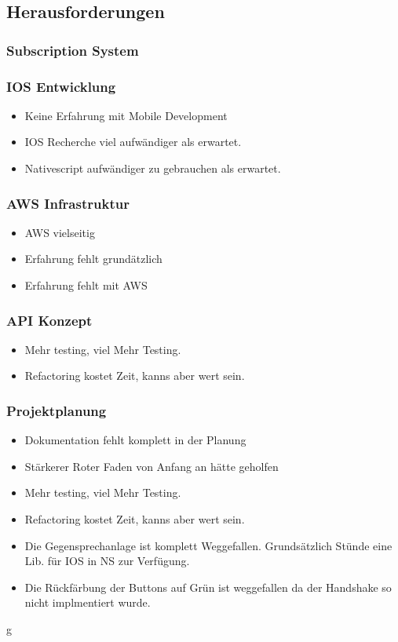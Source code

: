 \subsection{Herausforderungen}

\subsubsection*{Subscription System}

\subsubsection*{IOS Entwicklung}

\begin{itemize}
    \item Keine Erfahrung mit Mobile Development
    \item IOS Recherche viel aufwändiger als erwartet.
    \item Nativescript aufwändiger zu gebrauchen als erwartet.
\end{itemize}

\subsubsection*{AWS Infrastruktur}

\begin{itemize}
    \item AWS vielseitig
    \item Erfahrung fehlt grundätzlich
    \item Erfahrung fehlt mit AWS
\end{itemize}

\subsubsection*{API Konzept}

\begin{itemize}
    \item Mehr testing, viel Mehr Testing.
    \item Refactoring kostet Zeit, kanns aber wert sein.
\end{itemize}

\subsubsection*{Projektplanung}

\begin{itemize}
    \item Dokumentation fehlt komplett in der Planung
    \item Stärkerer Roter Faden von Anfang an hätte geholfen
    \item Mehr testing, viel Mehr Testing.
    \item Refactoring kostet Zeit, kanns aber wert sein.
\end{itemize}

\begin{itemize}
    \item Die Gegensprechanlage ist komplett Weggefallen.
    \subitem Grundsätzlich Stünde eine Lib. für IOS in NS zur Verfügung.
    \item Die Rückfärbung der Buttons auf Grün ist weggefallen da der Handshake so nicht implmentiert wurde.
\end{itemize}g

\clearpage
